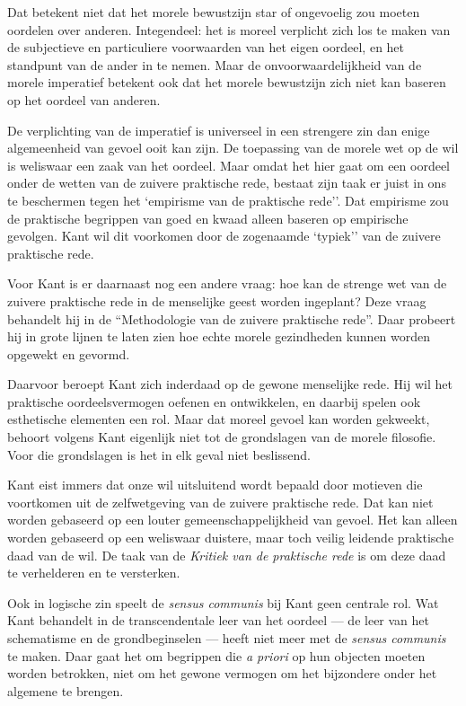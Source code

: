 Dat betekent niet dat het morele bewustzijn star of ongevoelig zou moeten oordelen over anderen. Integendeel: het is moreel verplicht zich los te maken van de subjectieve en particuliere voorwaarden van het eigen oordeel, en het standpunt van de ander in te nemen. Maar de onvoorwaardelijkheid van de morele imperatief betekent ook dat het morele bewustzijn zich niet kan baseren op het oordeel van anderen.

De verplichting van de imperatief is universeel in een strengere zin dan enige algemeenheid van gevoel ooit kan zijn. De toepassing van de morele wet op de wil is weliswaar een zaak van het oordeel. Maar omdat het hier gaat om een oordeel onder de wetten van de zuivere praktische rede, bestaat zijn taak er juist in ons te beschermen tegen het `empirisme van de praktische rede''. Dat empirisme zou de praktische begrippen van goed en kwaad alleen baseren op empirische gevolgen. Kant wil dit voorkomen door de zogenaamde `typiek'' van de zuivere praktische rede.

Voor Kant is er daarnaast nog een andere vraag: hoe kan de strenge wet van de zuivere praktische rede in de menselijke geest worden ingeplant? Deze vraag behandelt hij in de ``Methodologie van de zuivere praktische rede''. Daar probeert hij in grote lijnen te laten zien hoe echte morele gezindheden kunnen worden opgewekt en gevormd.

Daarvoor beroept Kant zich inderdaad op de gewone menselijke rede. Hij wil het praktische oordeelsvermogen oefenen en ontwikkelen, en daarbij spelen ook esthetische elementen een rol. Maar dat moreel gevoel kan worden gekweekt, behoort volgens Kant eigenlijk niet tot de grondslagen van de morele filosofie. Voor die grondslagen is het in elk geval niet beslissend.

Kant eist immers dat onze wil uitsluitend wordt bepaald door motieven die voortkomen uit de zelfwetgeving van de zuivere praktische rede. Dat kan niet worden gebaseerd op een louter gemeenschappelijkheid van gevoel. Het kan alleen worden gebaseerd op een weliswaar duistere, maar toch veilig leidende praktische daad van de wil. De taak van de \textit{Kritiek van de praktische rede} is om deze daad te verhelderen en te versterken.

Ook in logische zin speelt de \textit{sensus communis} bij Kant geen centrale rol. Wat Kant behandelt in de transcendentale leer van het oordeel — de leer van het schematisme en de grondbeginselen — heeft niet meer met de \textit{sensus communis} te maken. Daar gaat het om begrippen die \textit{a priori} op hun objecten moeten worden betrokken, niet om het gewone vermogen om het bijzondere onder het algemene te brengen.

